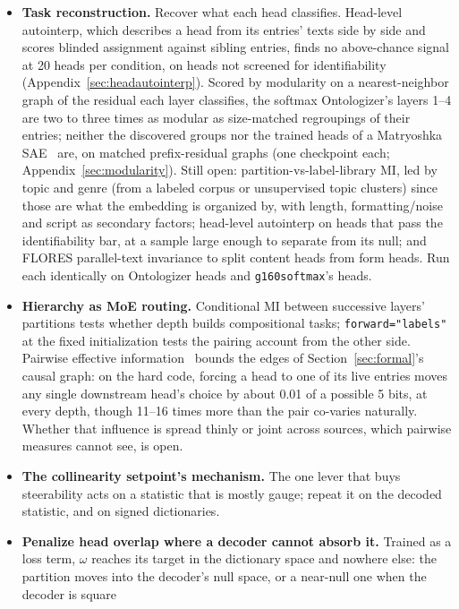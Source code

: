 \begin{itemize}
gradient at every step, and the comparison does not isolate the number
of entries.
\item \textbf{Task reconstruction.} Recover what each head classifies.
Head-level autointerp, which describes a head from its entries' texts
side by side and scores blinded assignment against sibling entries,
finds no above-chance signal at 20 heads per condition, on heads not
screened for identifiability (Appendix~\ref{sec:headautointerp}). Scored
by modularity on a nearest-neighbor graph of the residual each layer
classifies, the softmax Ontologizer's layers 1--4 are two to three times
as modular as size-matched regroupings of their entries; neither the
discovered groups nor the trained heads of a Matryoshka
SAE~\cite{bussmann2025} are, on matched
prefix-residual graphs (one checkpoint each;
Appendix~\ref{sec:modularity}). Still open:
partition-vs-label-library MI, led by topic and genre (from a labeled
corpus or unsupervised topic clusters) since those are what the
embedding is organized by, with length, formatting/noise and script as
secondary factors; head-level autointerp on heads that pass the
identifiability bar, at a sample large enough to separate from its
null; and FLORES parallel-text invariance to split content heads from
form heads. Run each identically on Ontologizer heads and
\texttt{g160softmax}'s heads.
\item \textbf{Hierarchy as MoE routing.} Conditional MI between
successive layers' partitions tests whether depth builds compositional
tasks; \texttt{forward="labels"} at the fixed initialization tests the
pairing account from the other side. Pairwise effective
information~\cite{hoel2013} bounds the edges of
Section~\ref{sec:formal}'s causal graph: on the hard code, forcing a
head to one of its live entries moves any single downstream head's
choice by about 0.01 of a possible 5 bits, at every depth, though 11--16
times more than the pair co-varies naturally. Whether that influence is
spread thinly or joint across sources, which pairwise measures cannot
see, is open.
\item \textbf{The collinearity setpoint's mechanism.} The one lever that
buys steerability acts on a statistic that is mostly gauge; repeat it on
the decoded statistic, and on signed dictionaries.
\item \textbf{Penalize head overlap where a decoder cannot absorb it.}
Trained as a loss term, $\omega$ reaches its target in the dictionary
space and nowhere else: the partition moves into the decoder's null
space, or a near-null one when the decoder is square

\end{itemize}

